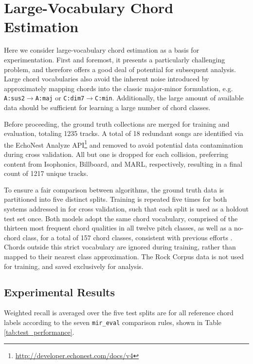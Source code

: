\documentclass{article}
\begin{document}
\section{Large-Vocabulary Chord Estimation}
\label{sec:experiment}

Here we consider large-vocabulary chord estimation as a basis for experimentation. %
First and foremost, it presents a particularly challenging problem, and therefore offers a good deal of potential for subsequent analysis.
Large chord vocabularies also avoid the inherent noise introduced by approximately mapping chords into the classic major-minor formulation, e.g. \texttt{A:sus2}$\to$\texttt{A:maj} or \texttt{C:dim7}$\to$\texttt{C:min}.
Additionally, the large amount of available data should be sufficient for learning a large number of chord classes.

Before proceeding, the ground truth collections are merged for training and evaluation, totaling 1235 tracks.
A total of 18 redundant songs are identified via the EchoNest Analyze API\footnote{\url{http://developer.echonest.com/docs/v4}} and removed to avoid potential data contamination during cross validation.
All but one is dropped for each collision, preferring content from Isophonics, Billboard, and MARL, respectively, resulting in a final count of 1217 unique tracks.

To ensure a fair comparison between algorithms, the ground truth data is partitioned into five distinct splits.
Training is repeated five times for both systems addressed in  for cross validation, such that each split is used as a holdout test set once.
Both models adopt the same chord vocabulary, comprised of the thirteen most frequent chord qualities in all twelve pitch classes, as well as a no-chord class, for a total of 157 chord classes, consistent with previous efforts \cite{Cho2014Improved}.
Chords outside this strict vocabulary are ignored during training, rather than mapped to their nearest class approximation.
The Rock Corpus data is not used for training, and saved exclusively for analysis.


\subsection{Experimental Results}
\label{subsec:experiment}

Weighted recall is averaged over the five test splits are for all reference chord labels according to the seven \texttt{mir\_eval} comparison rules, shown in Table \ref{tab:test_performance}.
\end{document}
